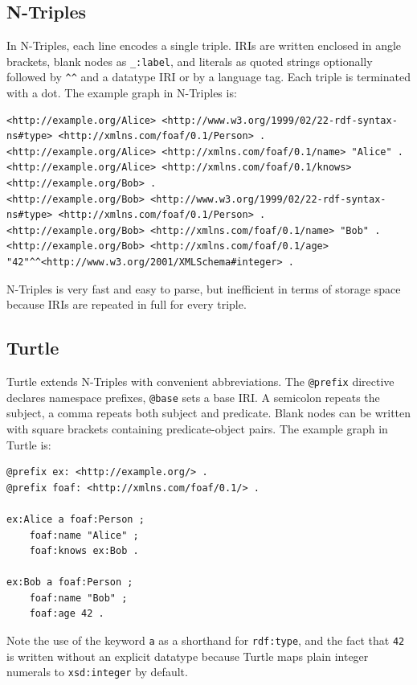 \subsection{N-Triples}
In N-Triples, each line encodes a single triple. IRIs are written enclosed in angle brackets, blank nodes as \texttt{\_:label}, and literals as quoted strings optionally followed by \texttt{\textasciicircum\textasciicircum} and a datatype IRI or by a language tag. Each triple is terminated with a dot. The example graph in N-Triples is:

\begin{lstlisting}[caption=Example graph in N-Triples]
<http://example.org/Alice> <http://www.w3.org/1999/02/22-rdf-syntax-ns#type> <http://xmlns.com/foaf/0.1/Person> .
<http://example.org/Alice> <http://xmlns.com/foaf/0.1/name> "Alice" .
<http://example.org/Alice> <http://xmlns.com/foaf/0.1/knows> <http://example.org/Bob> .
<http://example.org/Bob> <http://www.w3.org/1999/02/22-rdf-syntax-ns#type> <http://xmlns.com/foaf/0.1/Person> .
<http://example.org/Bob> <http://xmlns.com/foaf/0.1/name> "Bob" .
<http://example.org/Bob> <http://xmlns.com/foaf/0.1/age> "42"^^<http://www.w3.org/2001/XMLSchema#integer> .
\end{lstlisting}

N-Triples is very fast and easy to parse, but inefficient in terms of storage space because IRIs are repeated in full for every triple.

\subsection{Turtle}
Turtle extends N-Triples with convenient abbreviations. The \texttt{@prefix} directive declares namespace prefixes, \texttt{@base} sets a base IRI. A semicolon repeats the subject, a comma repeats both subject and predicate. Blank nodes can be written with square brackets containing predicate-object pairs. The example graph in Turtle is:

\begin{lstlisting}[caption=Example graph in Turtle]
@prefix ex: <http://example.org/> .
@prefix foaf: <http://xmlns.com/foaf/0.1/> .

ex:Alice a foaf:Person ;
    foaf:name "Alice" ;
    foaf:knows ex:Bob .

ex:Bob a foaf:Person ;
    foaf:name "Bob" ;
    foaf:age 42 .
\end{lstlisting}

\begin{note}{}
    Note the use of the keyword \texttt{a} as a shorthand for \texttt{rdf:type}, and the fact that \texttt{42} is written without an explicit datatype because Turtle maps plain integer numerals to \texttt{xsd:integer} by default.
\end{note}

